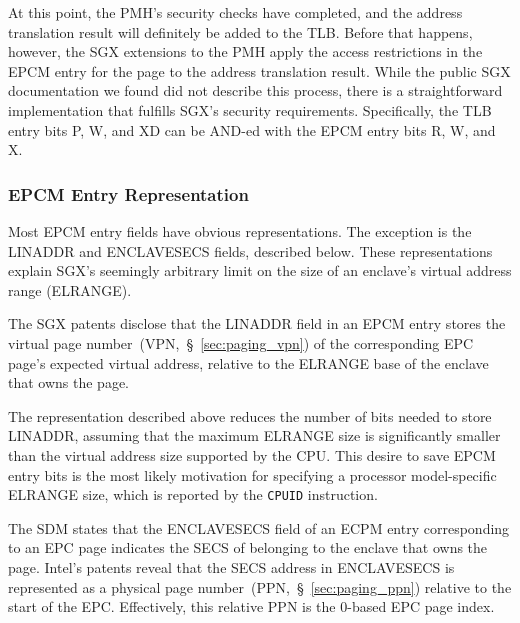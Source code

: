 At this point, the PMH's security checks have completed, and the address
translation result will definitely be added to the TLB. Before that happens,
however, the SGX extensions to the PMH apply the access restrictions in the
EPCM entry for the page to the address translation result. While the public SGX
documentation we found did not describe this process, there is a
straightforward implementation that fulfills SGX's security requirements.
Specifically, the TLB entry bits P, W, and XD can be AND-ed with the EPCM entry
bits R, W, and X.


\subsubsection{EPCM Entry Representation}
\label{sec:sgx_epcm_format}


Most EPCM entry fields have obvious representations. The exception is the
LINADDR and ENCLAVESECS fields, described below. These representations explain
SGX's seemingly arbitrary limit on the size of an enclave's virtual address
range (ELRANGE).

The SGX patents disclose that the LINADDR field in an EPCM entry stores the
virtual page number~(VPN,~\S~\ref{sec:paging_vpn}) of the corresponding EPC
page's expected virtual address, relative to the ELRANGE base of the enclave
that owns the page.

The representation described above reduces the number of bits needed to store
LINADDR, assuming that the maximum ELRANGE size is significantly smaller than
the virtual address size supported by the CPU. This desire to save EPCM entry
bits is the most likely motivation for specifying a processor model-specific
ELRANGE size, which is reported by the \texttt{CPUID} instruction.

The SDM states that the ENCLAVESECS field of an ECPM entry corresponding to an
EPC page indicates the SECS of belonging to the enclave that owns the page.
Intel's patents reveal that the SECS address in ENCLAVESECS is represented as
a physical page number~(PPN,~\S~\ref{sec:paging_ppn}) relative to the start of
the EPC. Effectively, this relative PPN is the 0-based EPC page index.

